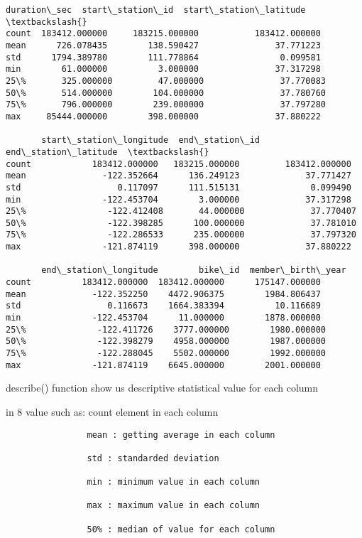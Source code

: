 \documentclass[11pt]{article}
\makeatletter
\newcommand{\boxspacing}{\kern\kvtcb@left@rule\kern\kvtcb@boxsep}
\newcommand{\prompt}[4]{
        {\ttfamily\llap{{\color{#2}[#3]:\hspace{3pt}#4}}\vspace{-\baselineskip}}
    }
\makeatother
\begin{document}
            \begin{tcolorbox}[breakable, size=fbox, boxrule=.5pt, pad at break*=1mm, opacityfill=0]
\prompt{Out}{outcolor}{16}{\boxspacing}
\begin{Verbatim}[commandchars=\\\{\}]
        duration\_sec  start\_station\_id  start\_station\_latitude  \textbackslash{}
count  183412.000000     183215.000000           183412.000000
mean      726.078435        138.590427               37.771223
std      1794.389780        111.778864                0.099581
min        61.000000          3.000000               37.317298
25\%       325.000000         47.000000               37.770083
50\%       514.000000        104.000000               37.780760
75\%       796.000000        239.000000               37.797280
max     85444.000000        398.000000               37.880222

       start\_station\_longitude  end\_station\_id  end\_station\_latitude  \textbackslash{}
count            183412.000000   183215.000000         183412.000000
mean               -122.352664      136.249123             37.771427
std                   0.117097      111.515131              0.099490
min                -122.453704        3.000000             37.317298
25\%                -122.412408       44.000000             37.770407
50\%                -122.398285      100.000000             37.781010
75\%                -122.286533      235.000000             37.797320
max                -121.874119      398.000000             37.880222

       end\_station\_longitude        bike\_id  member\_birth\_year
count          183412.000000  183412.000000      175147.000000
mean             -122.352250    4472.906375        1984.806437
std                 0.116673    1664.383394          10.116689
min              -122.453704      11.000000        1878.000000
25\%              -122.411726    3777.000000        1980.000000
50\%              -122.398279    4958.000000        1987.000000
75\%              -122.288045    5502.000000        1992.000000
max              -121.874119    6645.000000        2001.000000
\end{Verbatim}
\end{tcolorbox}
        
    describe() function show us descriptive statistical value for each
column

in 8 value such as: count element in each column

\begin{verbatim}
                mean : getting average in each column
                
                std : standarded deviation
                    
                min : minimum value in each column
                    
                max : maximum value in each column
                    
                50% : median of value for each column
\end{verbatim}
\end{document}

